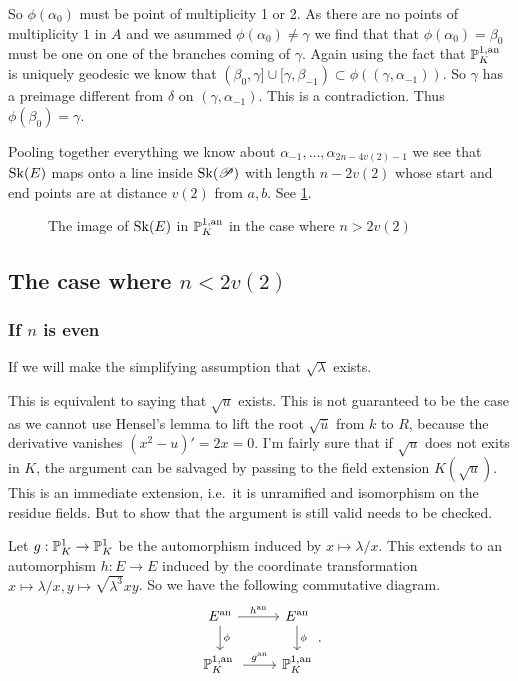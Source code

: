 So $\phi(\alpha_0)$ must be point of multiplicity 1 or 2. As there are no points of multiplicity $1$ in $A$ and we asummed $\phi(\alpha_0)\ne \gamma$ we find that that $\phi(\alpha_0) = \beta_0$ must be one on one of the branches coming of $\gamma$. 
Again using the fact that $\mathbb{P}^{1, \text{an}}_K$ is uniquely geodesic we know that $(\beta_0, \gamma] \cup [\gamma, \beta_{-1}) \subset  \phi((\gamma, \alpha_{-1}))$. 
So $\gamma$ has a preimage different from $\delta$ on $(\gamma, \alpha_{-1})$. 
This is a contradiction. 
Thus $\phi(\beta_0) = \gamma$. 

Pooling together everything we know about $\alpha_{-1}, \ldots, \alpha_{2n - 4v(2)-1}$ we see that $\operatorname{Sk}(E)$ maps onto a line inside $\operatorname{Sk}(\mathscr P)$ with length $n- 2v(2)$ whose start and end points are at distance $v(2)$ from $a, b$.
See \cref{fig:image_between_skeleta_wild_ims}.
\begin{figure}[h]
    \centering
    \caption{The image of $\operatorname{Sk}(E)$ in  $\mathbb{P}^{1, \text{an}}_K$ in the case where $n > 2v(2)$}
    \label{fig:image_between_skeleta_wild_ims}
\end{figure}

\subsection{The case where $n < 2 v(2)$} \label{sec:the_case_where_n_<_2_v2}

\subsubsection{If $n$ is even} \label{sec:if_$n$_is_even}

If we will make the simplifying assumption that $\sqrt{\lambda} $ exists. 
\begin{remark}
	This is equivalent to saying that $\sqrt{u} $ exists.
	This is not guaranteed to be the case as we cannot use Hensel's lemma to lift the root $\sqrt{\overline{u}} $ from $k$ to $R$, because the derivative vanishes $(x^2 - u)' = 2x = 0$. 
	I'm fairly sure that if $\sqrt{u} $ does not exits in $ K$, the argument can be salvaged by passing to the field extension $K(\sqrt{u} )$. 
	This is an immediate extension, i.e.\ it is unramified and isomorphism on the residue fields. 
	But to show that the argument is still valid needs to be checked.
\end{remark}

Let $g: \mathbb{P}^{1}_K \to \mathbb{P}^{1}_K$ be the automorphism induced by $x \mapsto \lambda / x$. 
This extends to an automorphism $h: E \to E$ induced by the coordinate transformation $x \mapsto  \lambda / x, y\mapsto \sqrt{\lambda ^3} x y$. 
So we have the following commutative diagram.
\[
\begin{tikzcd}
	E\an \rar{h\an} \dar{\phi} & E\an \dar{\phi} \\
	\pro^{1, \text{an }}_K \rar{g\an} & \pro^{1, \text{an}}_K
\end{tikzcd}
.\] 

